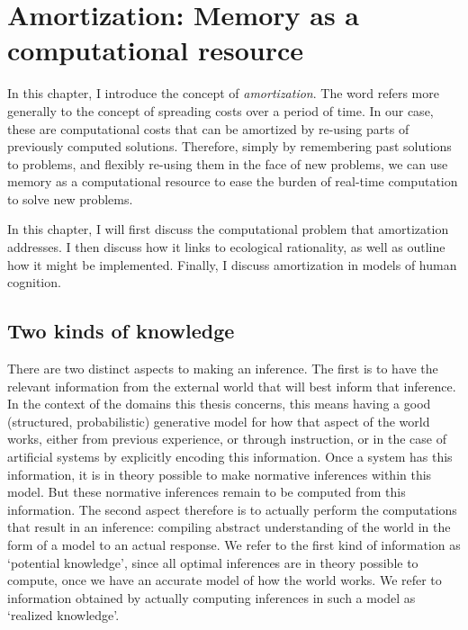 \chapter{Amortization: Memory as a computational resource}
\label{chap:amort}


In this chapter, I introduce the concept of \textit{amortization}. The word refers more generally to the concept of spreading costs over a period of time. In our case, these are computational costs that can be amortized by re-using parts of previously computed solutions. Therefore, simply by remembering past solutions to problems, and flexibly re-using them in the face of new problems, we can use memory as a computational resource to ease the burden of real-time computation to solve new problems. 

In this chapter, I will first discuss the computational problem that amortization addresses. I then discuss how it links to ecological rationality, as well as outline how it might be implemented. Finally, I discuss amortization in models of human cognition.

\section{Two kinds of knowledge}

There are two distinct aspects to making an inference. The first is to have the relevant information from the external world that will best inform that inference. In the context of the domains this thesis concerns, this means having a good (structured, probabilistic) generative model for how that aspect of the world works, either from previous experience, or through instruction, or in the case of artificial systems by explicitly encoding this information. Once a system has this information, it is in theory possible to make normative inferences within this model. But these normative inferences remain to be computed from this information. The second aspect therefore is to actually perform the computations that result in an inference: compiling abstract understanding of the world in the form of a model to an actual response. We refer to the first kind of information as `potential knowledge', since all optimal inferences are in theory possible to compute, once we have an accurate model of how the world works. We refer to information obtained by actually computing inferences in such a model as `realized knowledge'. 

